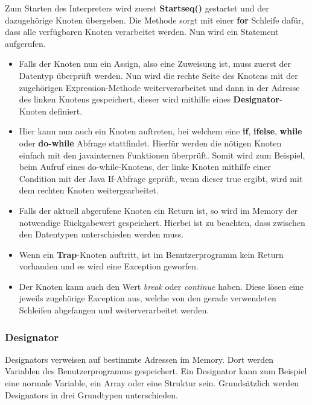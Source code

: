 Zum Starten des Interpreters wird zuerst \textbf{Startseq()} gestartet und der dazugehörige Knoten übergeben. Die Methode sorgt mit einer \textbf{for} Schleife dafür, dass alle verfügbaren Knoten verarbeitet werden. Nun wird ein Statement aufgerufen. 
\begin{itemize}
\item Falls der Knoten nun ein Assign, also eine Zuweisung ist, muss zuerst der Datentyp überprüft werden. Nun wird die rechte Seite des Knotens mit der zugehörigen Expression-Methode weiterverarbeitet und dann in der Adresse des linken Knotens gespeichert, dieser wird mithilfe eines \textbf{Designator}-Knoten definiert.
\item Hier kann nun auch ein Knoten auftreten, bei welchem eine \textbf{if}, \textbf{ifelse}, \textbf{while} oder \textbf{do-while} Abfrage stattfindet. Hierfür werden die nötigen Knoten einfach mit den javainternen Funktionen überprüft. Somit wird zum Beispiel, beim Aufruf eines do-while-Knotens, der linke Knoten mithilfe einer Condition mit der Java If-Abfrage geprüft, wenn dieser true ergibt, wird mit dem rechten Knoten weitergearbeitet.
\item Falls der aktuell abgerufene Knoten ein Return ist, so wird im Memory der notwendige Rückgabewert gespeichert. Hierbei ist zu beachten, dass zwischen den Datentypen unterschieden werden muss.
\item Wenn ein \textbf{Trap}-Knoten auftritt, ist im Benutzerprogramm kein Return vorhanden und es wird eine Exception geworfen.
\item Der Knoten kann auch den Wert \textit{break} oder \textit{continue} haben. Diese lösen eine jeweils zugehörige Exception aus, welche von den gerade verwendeten Schleifen abgefangen und weiterverarbeitet werden.
\end{itemize}

\subsubsection{Designator}
Designators verweisen auf bestimmte Adressen im Memory. Dort werden Variablen des Benutzerprogramms gespeichert. Ein Designator kann zum Beispiel eine normale Variable, ein Array oder eine Struktur sein. Grundsätzlich werden Designators in drei Grundtypen unterschieden.

